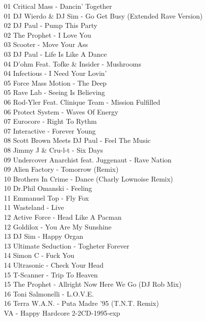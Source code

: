 \begin{multicols}{2}
 01 Critical Mass - Dancin' Together\\ 01 DJ Wierdo \& DJ Sim - Go Get Busy (Extended Rave Version)\\ 02 DJ Paul - Pump This Party\\ 02 The Prophet - I Love You\\ 03 Scooter - Move Your Ass\\ 03 DJ Paul - Life Is Like A Dance\\ 04 D'ohm Feat. Tofke \& Insider - Mushrooms\\ 04 Infectious - I Need Your Lovin'\\ 05 Force Mass Motion - The Deep\\ 05 Rave Lab - Seeing Is Believing\\ 06 Rod-Yler Feat. Clinique Team - Mission Fulfilled\\ 06 Protect System - Waves Of Energy\\ 07 Eurocore - Right To Rythm\\ 07 Interactive - Forever Young\\ 08 Scott Brown Meets DJ Paul - Feel The Music\\ 08 Jimmy J \& Cru-l-t - Six Days\\ 09 Undercover Anarchist feat. Juggenaut - Rave Nation\\ 09 Alien Factory - Tomorrow (Remix)\\ 10 Brothers In Crime - Dance (Charly Lownoise Remix)\\ 10 Dr.Phil Omanski - Feeling\\ 11 Emmanuel Top - Fly Fox\\ 11 Wasteland - Live\\ 12 Active Force - Head Like A Pacman\\ 12 Goldilox - You Are My Sunshine\\ 13 DJ Sim - Happy Organ\\ 13 Ultimate Seduction - Togheter Forever\\ 14 Simon C - Fuck You\\ 14 Ultrasonic - Check Your Head\\ 15 T-Scanner - Trip To Heaven\\ 15 The Prophet - Allright Now Here We Go (DJ Rob Mix)\\ 16 Toni Salmonelli - L.O.V.E.\\ 16 Terra W.A.N. - Puta Madre '95 (T.N.T. Remix)\\
 \large VA - Happy Hardcore 2-2CD-1995-exp \normalsize\\

\end{multicols}

